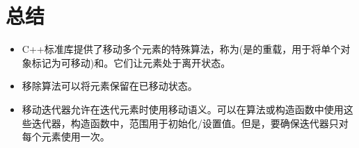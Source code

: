 \section{总结}
\begin{itemize}
	\item C++标准库提供了移动多个元素的特殊算法，称为(是的重载，用于将单个对象标记为可移动)和。它们让元素处于离开状态。
	\item 移除算法可以将元素保留在已移动状态。
	\item 移动迭代器允许在迭代元素时使用移动语义。可以在算法或构造函数中使用这些迭代器，构造函数中，范围用于初始化/设置值。但是，要确保迭代器只对每个元素使用一次。
\end{itemize}


